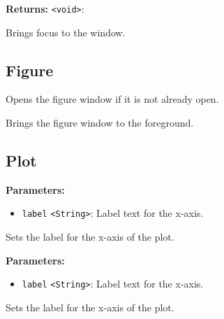 \documentclass[12pt,a4paper]{article}
\begin{document}
\noindent \textbf{Returns:} \texttt{<void>}: 

\noindent Brings focus to the window.


\subsection{Figure}
\vspace{5mm}
\noindent {}


\noindent Opens the figure window if it is not already open.

\vspace{5mm}
\noindent {}


\noindent Brings the figure window to the foreground.


\subsection{Plot}
\vspace{5mm}
\noindent {}


\noindent \textbf{Parameters:}
\begin{itemize}
  \item \texttt{label} \texttt{<String>}: Label text for the x-axis.
\end{itemize}

\noindent Sets the label for the x-axis of the plot.

\vspace{5mm}
\noindent {}


\noindent \textbf{Parameters:}
\begin{itemize}
  \item \texttt{label} \texttt{<String>}: Label text for the x-axis.
\end{itemize}

\noindent Sets the label for the x-axis of the plot.

\vspace{5mm}
\noindent {}
\end{document}
